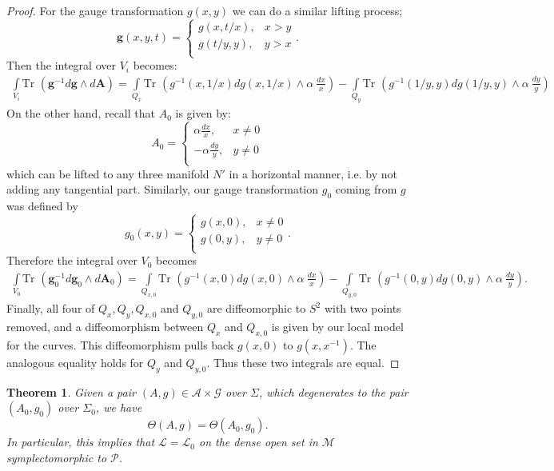 \documentclass[]{article}
\newtheorem{theorem}{Theorem}
\newcommand{\bg}{\mathbf{g}}
\newcommand{\bA}{\mathbf{A}}
\newcommand{\LL}{\mathcal{L}}
\newcommand{\MM}{\mathcal{M}}
\newcommand{\cP}{\mathcal{P}}
\newcommand{\Tr}{\text{Tr }}
\begin{document}
\begin{proof}
		For the gauge transformation $g(x,y)$ we can do a similar lifting process;
		\begin{equation}
			\bg(x,y,t) =\begin{cases}
			g\left(x,t/x\right), & x>y\\
			g\left(t/y,y\right), & y>x\\
			\end{cases}.
		\end{equation}
		Then the integral over $V_i$ becomes:
		\begin{align*}
			\int\limits_{V_i} \Tr(\bg^{-1}d\bg\wedge d\bA) = \int\limits_{Q_x} \Tr(g^{-1}(x,1/x)dg(x,1/x)\wedge \alpha~ \frac{dx}{x}) - \int\limits_{Q_y} \Tr(g^{-1}(1/y,y)dg(1/y,y)\wedge \alpha~ \frac{dy}{y})
		\end{align*}
		On the other hand, recall that $A_0$ is given by:
		\begin{equation}
			A_0 = \begin{cases}
			\alpha \frac{dx}{x}, & x\neq 0\\
			-\alpha \frac{dy}{y}, & y\neq 0\\
			\end{cases}
		\end{equation}
		which can be lifted to any three manifold $N'$ in a horizontal manner, i.e. by not adding any tangential part. Similarly, our gauge transformation $g_0$ coming from $g$ was defined by 
		\begin{equation}
		g_0(x,y) =\begin{cases}
		g\left(x,0\right), & x\neq 0\\
		g\left(0,y\right), & y \neq 0 \\
		\end{cases}.
		\end{equation}
		Therefore the integral over $V_0$ becomes
		\begin{align*}
		\int\limits_{V_0} \Tr(\bg_0^{-1}d\bg_0\wedge d\bA_0) = \int\limits_{Q_{x,0}} \Tr(g^{-1}(x,0)dg(x,0)\wedge \alpha~ \frac{dx}{x}) - \int\limits_{Q_{y,0}} \Tr(g^{-1}(0,y)dg(0,y)\wedge \alpha~ \frac{dy}{y}).
		\end{align*}
		Finally, all four of $Q_x,Q_y, Q_{x,0}$ and $Q_{y,0}$ are diffeomorphic to $S^2$ with two points removed, and a diffeomorphism between $Q_x$ and $Q_{x,0}$ is given by our local model for the curves. This diffeomorphism pulls back $g(x,0)$ to $g(x,x^{-1})$. The analogous equality holds for $Q_y$ and $Q_{y,0}$. Thus these two integrals are equal.
	\end{proof}
	\begin{theorem}
		Given a pair $(A,g) \in \mathcal{A}\times\mathcal{G}$ over $\Sigma$, which degenerates to the pair $(A_0, g_0)$ over $\Sigma_0$, we have
		\begin{equation}
			\Theta(A,g) = \Theta(A_0, g_0).
		\end{equation}
		In particular, this implies that $\LL = \LL_0$ on the dense open set in $\MM$ symplectomorphic to $\cP$.
		\label{t:l=l0}
	\end{theorem}
\end{document}
